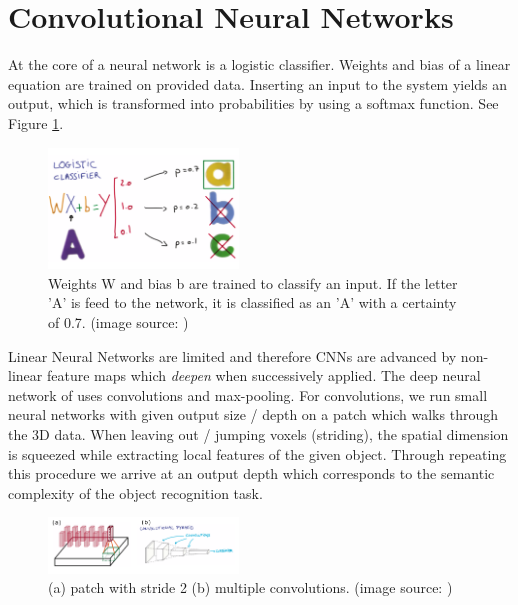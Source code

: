 \documentclass[10pt,twocolumn,letterpaper]{article}
\begin{document}
\section{Convolutional Neural Networks}

At the core of a neural network is a logistic classifier. 
Weights and bias of a linear equation are trained on provided data. Inserting an input to the system yields an output, which is
transformed into probabilities by using a softmax function. See Figure \ref{fig:classifier}.

\begin{figure}[h]
	\label{fig:classifier}
	\centering
	\includegraphics[width=0.45\textwidth]{figures/classifier}
	\caption{Weights W and bias b are trained to classify an input. If the letter 'A' is feed to the network,
	it is classified as an 'A' with a certainty of 0.7. (image source: \cite{udacity})}
\end{figure}

Linear Neural Networks are limited and therefore CNNs are advanced by non-linear feature maps which \textit{deepen} 
when successively applied. The deep neural network of \cite{voxnet} uses convolutions and max-pooling.
For convolutions, we run small neural networks with given output size / depth on a patch which walks through the 3D data. 
When leaving out / jumping voxels (striding),
the spatial dimension is squeezed while extracting local features of the given object. 
Through repeating this procedure we arrive at an output depth which corresponds to the semantic complexity of the object recognition task. 

\begin{figure}[h]
	\label{fig:convolution}
	\includegraphics[width=0.45\textwidth]{figures/conv}
	\caption{(a) patch with stride 2 (b) multiple convolutions. (image source: \cite{udacity})}
\end{figure}
\end{document}
